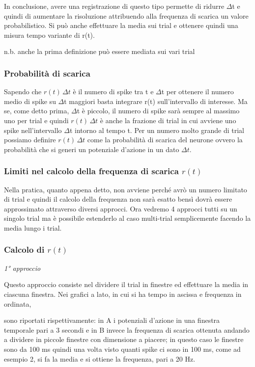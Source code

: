\documentclass[12pt,a4paper,openany]{book}
\begin{document}
In conclusione, avere una registrazione di questo tipo permette di ridurre $\Delta$t e quindi di aumentare la risoluzione attribuendo alla frequenza di scarica un valore probabilistico. Si può anche effettuare la media sui trial e ottenere quindi una misura tempo variante di r(t).

n.b. anche la prima definizione può essere mediata sui vari trial

\subsubsection{Probabilità di scarica}

Sapendo che $r(t)\,\Delta t$ è il numero di spike tra t e $\Delta$t per ottenere il numero medio di spike su $\Delta$t maggiori basta integrare r(t) sull'intervallo di interesse. Ma se, come detto prima, $\Delta$t è piccolo, il numero di spike sarà sempre al massimo uno per trial e quindi $r(t)\,\Delta t$ è anche la frazione di trial in cui avviene uno spike nell'intervallo $\Delta$t intorno al tempo t. Per un numero molto grande di trial possiamo definire $r(t)\,\Delta t$ come la probabilità di scarica del neurone ovvero la probabilità che si generi un potenziale d'azione in un dato $\Delta t$.

\subsubsection{Limiti nel calcolo della frequenza di scarica $r(t)$}

Nella pratica, quanto appena detto, non avviene perché avrò un numero limitato di trial e quindi il calcolo della frequenza non sarà esatto bensì dovrà essere approssimato attraverso diversi approcci. Ora vedremo 4 approcci tutti su un singolo trial ma è possibile estenderlo al caso multi-trial semplicemente facendo la media lungo i trial.

\subsubsection{Calcolo di $r(t)$}

\textit{1° approccio}

Questo approccio consiste nel dividere il trial in finestre ed effettuare la media in ciascuna finestra. Nei grafici a lato, in cui si ha tempo in ascissa e frequenza in ordinata,

sono riportati rispettivamente: in A i potenziali d'azione in una finestra temporale pari a 3 secondi e in B invece la frequenza di scarica ottenuta andando a dividere in piccole finestre con dimensione a piacere; in questo caso le finestre sono da 100 ms quindi una volta visto quanti spike ci sono in 100 ms, come ad esempio 2, si fa la media e si ottiene la frequenza, pari a 20 Hz.
\end{document}

